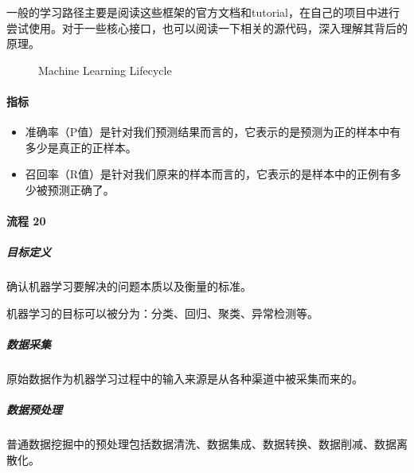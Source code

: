 \documentclass[letterpaper,10pt,english]{sphinxmanual}
\begin{document}
一般的学习路径主要是阅读这些框架的官方文档和tutorial，在自己的项目中进行尝试使用。对于一些核心接口，也可以阅读一下相关的源代码，深入理解其背后的原理。

\begin{figure}[H]
\centering
\capstart

\noindent{}
\caption{Machine Learning
Lifecycle\sphinxfootnotemark[928]}\label{\detokenize{chapter_AI_dive/ML:id25}}\end{figure}
%
\begin{footnotetext}[928]\sphinxAtStartFootnote
{}
%
\end{footnotetext}\ignorespaces 

\paragraph{指标}
\label{\detokenize{chapter_AI_dive/ML:id10}}\begin{itemize}
\item {} 
准确率（P值）是针对我们预测结果而言的，它表示的是预测为正的样本中有多少是真正的正样本。

\item {} 
召回率（R值）是针对我们原来的样本而言的，它表示的是样本中的正例有多少被预测正确了。

\end{itemize}


\paragraph{流程 20\sphinxfootnotemark[929]}
\label{\detokenize{chapter_AI_dive/ML:id11}}%
\begin{footnotetext}[929]\sphinxAtStartFootnote
{}
%
\end{footnotetext}\ignorespaces 

\subparagraph{目标定义}
\label{\detokenize{chapter_AI_dive/ML:id12}}
确认机器学习要解决的问题本质以及衡量的标准。

机器学习的目标可以被分为：分类、回归、聚类、异常检测等。


\subparagraph{数据采集}
\label{\detokenize{chapter_AI_dive/ML:id13}}
原始数据作为机器学习过程中的输入来源是从各种渠道中被采集而来的。


\subparagraph{数据预处理}
\label{\detokenize{chapter_AI_dive/ML:id14}}
普通数据挖掘中的预处理包括数据清洗、数据集成、数据转换、数据削减、数据离散化。
\end{document}
